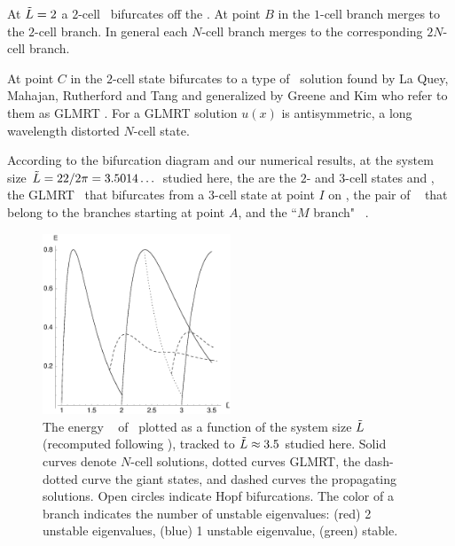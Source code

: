 At $\tilde{L}=2$ a $2$-cell \eqv\ bifurcates off the  \eqv. 
At point $B$ in 
the $1$-cell branch merges to the $2$-cell branch. 
In general each $N$-cell branch merges to the corresponding $2N$-cell branch.

At point $C$ in 
the $2$-cell state bifurcates to a type of 
\eqv\ solution
found by La Quey, Mahajan, Rutherford and Tang and generalized by Greene and Kim who refer to them as GLMRT \eqva. 
For a GLMRT solution $u(x)$ is antisymmetric,
a long wavelength distorted $N$-cell state.


According to the bifurcation diagram 
and our numerical results, 
at the system size $\tilde{L}=22/2\pi = 3.5014\dots$
studied here,
the {\eqva} are the $2$- and $3$-cell states  and ,
the GLMRT \eqv\ that bifurcates from a $3$-cell state at point $I$
on ,
the pair of \reqva\  
that belong to the branches starting at point
$A$,
and the ``$M$ branch"  \reqva\ .

\begin{figure}[t]		\label{fig:ksBifDiag}
\begin{center} 
\includegraphics[width=0.5\textwidth]{figs/ksBifDiag.eps}
\end{center}
\caption{
The energy \expctE\    of \eqva\
plotted as a function of the system size
$\tilde{L}$ (recomputed following ), tracked to
$\tilde{L} \approx 3.5$ studied here.
Solid curves denote $N$-cell solutions,
dotted curves GLMRT, the dash-dotted curve the
giant states, and dashed curves the propagating solutions.
Open circles indicate Hopf bifurcations. 
The color of a branch indicates the number of unstable
eigenvalues: (red) 2 unstable eigenvalues, (blue) 1
unstable eigenvalue, (green) stable. 
        }
\end{figure}

